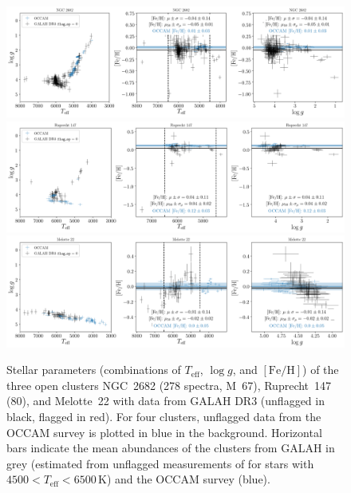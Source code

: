 \documentclass[fleqn,usenatbib,useAMS]{mnras}
\newcommand{\Teff}{$T_\mathrm{eff}$\xspace}
\newcommand{\logg}{$\log g$\xspace}
\newcommand{\feh}{$\mathrm{[Fe/H]}$\xspace}
\begin{document}
\begin{figure}
\centering
\includegraphics[width=\textwidth]{figures/oc_NGC_2682.png}
\includegraphics[width=\textwidth]{figures/oc_Ruprecht_147.png}
\includegraphics[width=\textwidth]{figures/oc_Melotte_22.png}
\caption{Stellar parameters (combinations of \Teff, \logg, and \feh) of the three open clusters NGC~2682 (278 spectra, M~67), Ruprecht~147 (80), and Melotte~22  with data from GALAH DR3 (unflagged in black, flagged in red). For four clusters, unflagged data from the OCCAM survey \citep{Donor2020} is plotted in blue in the background. Horizontal bars indicate the mean abundances of the clusters from GALAH in grey (estimated from unflagged measurements of for stars with $4500 < T_\mathrm{eff} < 6500\,\mathrm{K}$) and the OCCAM survey (blue).}
\label{fig:oc_stellar_params}
\end{figure}
\end{document}
